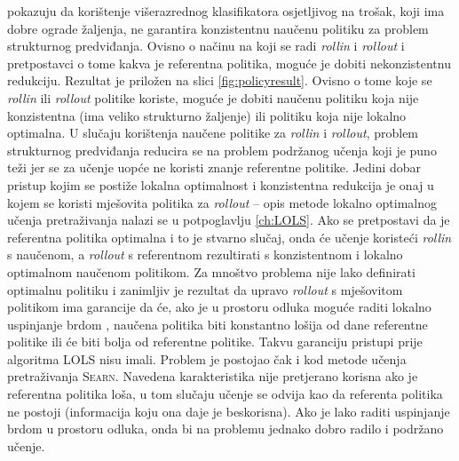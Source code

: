 \cite{daume15lols} pokazuju da korištenje višerazrednog klasifikatora
osjetljivog na trošak, koji ima dobre ograde žaljenja, ne garantira konzistentnu
naučenu politiku za problem strukturnog predviđanja. Ovisno o načinu na koji se
radi \textit{rollin} i \textit{rollout} i pretpostavci o tome kakva je
referentna politika, moguće je dobiti nekonzistentnu redukciju. Rezultat je
priložen na slici \ref{fig:policyresult}. Ovisno o tome koje se \textit{rollin}
ili \textit{rollout} politike koriste, moguće je dobiti naučenu politiku koja nije
konzistentna (ima veliko strukturno žaljenje) ili politiku koja nije lokalno
optimalna. U slučaju korištenja naučene politike za \textit{rollin} i
\textit{rollout}, problem strukturnog predviđanja reducira se na problem
podržanog učenja koji je puno teži jer se za učenje uopće ne koristi znanje
referentne politike. Jedini dobar pristup kojim se postiže lokalna optimalnost i
konzistentna redukcija je onaj u kojem se koristi mješovita politika za
\textit{rollout} -- opis metode lokalno optimalnog učenja pretraživanja nalazi
se u potpoglavlju \ref{ch:LOLS}. Ako se pretpostavi da je referentna politika
optimalna i to je stvarno slučaj, onda će učenje koristeći \textit{rollin} s
naučenom, a \textit{rollout} s referentnom rezultirati s konzistentnom i lokalno
optimalnom naučenom politikom. Za mnoštvo problema nije lako definirati optimalnu
politiku i zanimljiv je rezultat da upravo \textit{rollout} s mješovitom politikom
ima garancije da će, ako je u prostoru odluka moguće raditi lokalno uspinjanje
brdom , naučena politika biti konstantno lošija od dane
referentne politike ili će biti bolja od referentne politike. Takvu garanciju
pristupi prije algoritma \textsc{LOLS} nisu imali. Problem je postojao čak i kod
metode učenja pretraživanja \textsc{Searn}. Navedena karakteristika nije
pretjerano korisna ako je referentna politika loša, u tom slučaju učenje se
odvija kao da referenta politika ne postoji (informacija koju ona daje je
beskorisna). Ako je lako raditi uspinjanje brdom u prostoru odluka, onda bi
na problemu jednako dobro radilo i podržano učenje.

